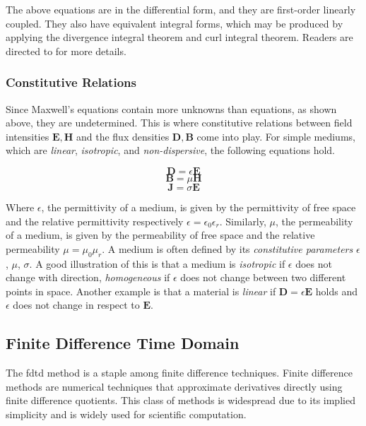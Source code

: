 The above equations are in the differential form, and they are first-order linearly coupled. They also have equivalent integral forms, which may be produced by applying the divergence integral theorem and curl integral theorem. Readers are directed to \cite[Chapter~2.4]{staelin2009electromagnetics} for more details. 




\subsubsection*{Constitutive Relations}
Since Maxwell's equations contain more unknowns than equations, as shown above, they are undetermined. This is where constitutive relations between field intensities $\mathbf{E},\mathbf{H}$ and the flux densities $\mathbf{D},\mathbf{B}$ come into play. 
For simple mediums, which are \textit{linear}, \textit{isotropic}, and \textit{non-dispersive}, the following equations hold.


\begin{equation}
\mathbf{D} = \epsilon \mathbf{E}
\end{equation}
\begin{equation}
\mathbf{B} = \mu \mathbf{H}
\end{equation}
\begin{equation}
\mathbf{J} = \sigma \mathbf{E}
\end{equation}

Where $\epsilon$, the permittivity of a medium, is given by the permittivity of free space and the relative permittivity respectively $\epsilon = \epsilon_0\epsilon_r$. Similarly, $\mu$, the permeability of a medium, is given by the permeability of free space and the relative permeability $\mu = \mu_0\mu_r$. A medium is often defined by its \textit{constitutive parameters} $\epsilon$, $\mu$, $\sigma$. A good illustration of this is that a medium is \textit{isotropic} if $\epsilon$ does not change with direction, \textit{homogeneous} if $\epsilon$ does not change between two different points in space. Another example is that a material is \textit{linear} if $\mathbf{D} = \epsilon \mathbf{E}$ holds and $\epsilon$ does not change in respect to $\mathbf{E}$.





\subsection*{Finite Difference Time Domain}
The \gls{fdtd} method is a staple among finite difference techniques. Finite difference methods are numerical techniques that approximate derivatives directly using finite difference quotients. This class of methods is widespread due to its implied simplicity and is widely used for scientific computation. 


